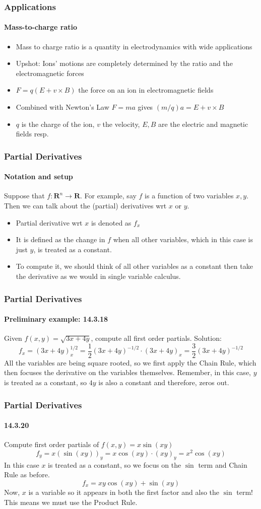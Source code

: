 \documentclass[xcolor=svgnames]{beamer}
\begin{document}
\begin{frame}
\frametitle{Applications}
\framesubtitle{Mass-to-charge ratio}
\begin{itemize}
\item Mass to charge ratio is a quantity in electrodynamics with wide applications
\item Upshot: Ions' motions are completely determined by the ratio and the electromagnetic forces
\item $F = q(E + v \times B)$ the force on an ion in electromagnetic fields
\item Combined with Newton's Law $F = ma$ gives $(m/q)a = E + v \times B$
\item $q$ is the charge of the ion, $v$ the velocity, $E,B$ are the electric and magnetic fields resp.
\end{itemize}
\end{frame}
\begin{frame}
\frametitle{Partial Derivatives}
\framesubtitle{Notation and setup}
Suppose that $f: \mathbf{R}^n \to \mathbf{R}$. For example, say $f$ is a function of two variables $x,y$. Then we can talk about the (partial) derivatives wrt $x$ or $y$. 

\begin{itemize}
\item Partial derivative wrt $x$ is denoted as $f_x$
\item It is defined as the change in $f$ when all other variables, which in this case is just $y$, is treated as a constant. 
\item To compute it, we should think of all other variables as a constant then take the derivative as we would in single variable calculus. 

\end{itemize}


\end{frame}
\begin{frame}
\frametitle{Partial Derivatives}
\framesubtitle{Preliminary example: 14.3.18}
Given $f(x,y) = \sqrt{3x + 4y}$, compute all first order partials. 
Solution: 
\[
f_x = (3x + 4y)^{1/2} _ x = \frac{1}{2} (3x + 4y)^{-1/2} \cdot (3x + 4y) _x = \frac{3}{2} (3x + 4y)^{-1/2}
\]
All the variables are being square rooted, so we first apply the Chain Rule, which then focuses the derivative on the variables themselves. Remember, in this case, $y$ is treated as a constant, so $4y$ is also a constant and therefore, zeros out. 
\end{frame}
\begin{frame}
\frametitle{Partial Derivatives}
\framesubtitle{14.3.20}
Compute first order partials of $f(x,y) = x \sin (xy)$
\[
f_y = x (\sin (xy))_y = x \cos (xy) \cdot (xy)_y = x^2 \cos (xy) 
\]
In this case $x$ is treated as a constant, so we focus on the $\sin$ term and Chain Rule as before. 
\[
f_x = xy \cos (xy) + \sin (xy)
\]
Now, $x$ is a variable so it appears in both the first factor and also the $\sin$ term! This means we must use the Product Rule. 
\end{frame}
\end{document}
